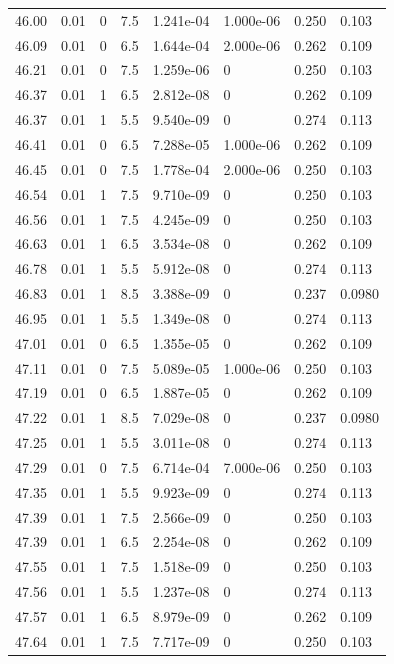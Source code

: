 \documentclass[preview]{standalone}
\begin{document}
{{{{{{{{{{{{{{{\begin{tabular}{L{1.2cm}C{1.2cm} C{0.3cm}C{0.5cm} C{1.4cm}C{1.4cm} C{1.4cm}C{1.4cm}}
  46.00  &  0.01  & 0     & 7.5 &  1.241e-04  & 1.000e-06  & 0.250 &  0.103   \\ 
  46.09  &  0.01  & 0     & 6.5 &  1.644e-04  & 2.000e-06  & 0.262 &  0.109   \\ 
  46.21  &  0.01  & 0     & 7.5 &  1.259e-06  & 0  & 0.250 &  0.103   \\ 
  46.37  &  0.01  & 1     & 6.5 &  2.812e-08  & 0  & 0.262 &  0.109   \\ 
  46.37  &  0.01  & 1     & 5.5 &  9.540e-09  & 0  & 0.274 &  0.113   \\ 
  46.41  &  0.01  & 0     & 6.5 &  7.288e-05  & 1.000e-06  & 0.262 &  0.109   \\ 
  46.45  &  0.01  & 0     & 7.5 &  1.778e-04  & 2.000e-06  & 0.250 &  0.103   \\ 
  46.54  &  0.01  & 1     & 7.5 &  9.710e-09  & 0  & 0.250 &  0.103   \\ 
  46.56  &  0.01  & 1     & 7.5 &  4.245e-09  & 0  & 0.250 &  0.103   \\ 
  46.63  &  0.01  & 1     & 6.5 &  3.534e-08  & 0  & 0.262 &  0.109   \\ 
  46.78  &  0.01  & 1     & 5.5 &  5.912e-08  & 0  & 0.274 &  0.113   \\ 
  46.83  &  0.01  & 1     & 8.5 &  3.388e-09  & 0  & 0.237 &  0.0980   \\ 
  46.95  &  0.01  & 1     & 5.5 &  1.349e-08  & 0  & 0.274 &  0.113   \\ 
  47.01  &  0.01  & 0     & 6.5 &  1.355e-05  & 0  & 0.262 &  0.109   \\ 
  47.11  &  0.01  & 0     & 7.5 &  5.089e-05  & 1.000e-06  & 0.250 &  0.103   \\ 
  47.19  &  0.01  & 0     & 6.5 &  1.887e-05  & 0  & 0.262 &  0.109   \\ 
  47.22  &  0.01  & 1     & 8.5 &  7.029e-08  & 0  & 0.237 &  0.0980   \\ 
  47.25  &  0.01  & 1     & 5.5 &  3.011e-08  & 0  & 0.274 &  0.113   \\ 
  47.29  &  0.01  & 0     & 7.5 &  6.714e-04  & 7.000e-06  & 0.250 &  0.103   \\ 
  47.35  &  0.01  & 1     & 5.5 &  9.923e-09  & 0  & 0.274 &  0.113   \\ 
  47.39  &  0.01  & 1     & 7.5 &  2.566e-09  & 0  & 0.250 &  0.103   \\ 
  47.39  &  0.01  & 1     & 6.5 &  2.254e-08  & 0  & 0.262 &  0.109   \\ 
  47.55  &  0.01  & 1     & 7.5 &  1.518e-09  & 0  & 0.250 &  0.103   \\ 
  47.56  &  0.01  & 1     & 5.5 &  1.237e-08  & 0  & 0.274 &  0.113   \\ 
  47.57  &  0.01  & 1     & 6.5 &  8.979e-09  & 0  & 0.262 &  0.109   \\ 
  47.64  &  0.01  & 1     & 7.5 &  7.717e-09  & 0  & 0.250 &  0.103   \\ 
\hline 
\end{tabular} 

}}}}}}}}}}}}}}}
\end{document}
